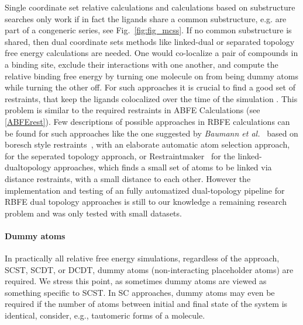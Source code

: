 \documentclass[9pt,bestpractices]{livecoms}
\begin{document}
Single coordinate set relative calculations and calculations based on substructure searches only work if in fact the ligands share a common substructure, e.g. are part of a congeneric series, see Fig.~\ref{fig:fig_mcss}.
If no common substructure is shared, then dual coordinate sets methods like linked-dual or separated topology free energy calculations are needed. One would co-localize a pair of compounds in a binding site, exclude their interactions with one another, and compute the relative binding free energy by turning one molecule on from being dummy atoms while turning the other off.
For such approaches it is crucial to find a good set of restraints, that keep the ligands colocalized over the time of the simulation . This problem is similar to the required restraints in ABFE Calculations (see \ref{ABFErest}). Few descriptions of possible approaches in RBFE calculations can be found for such approaches like the one suggested by \textit{Baumann et al.}~\cite{baumann2023broadening} based on boresch style restraints~\cite{boresch2003absolute}, with an elaborate automatic atom selection approach, for the seperated topology approach, or Restraintmaker~\cite{ries2022restraintmaker} for the linked-dualtopology approaches, which finds a small set of atoms to be linked via distance restraints, with a small distance to each other. 
However the implementation and testing of an fully automatized dual-topology pipeline for RBFE dual topology approaches is still to our knowledge a remaining research problem and was only tested with small datasets. \cite{jespers2019qligfep, Rieder2022Lev}

\paragraph{Dummy atoms}

In practically all relative free energy simulations, regardless of the approach, SCST, SCDT, or DCDT, dummy atoms (non-interacting placeholder atoms) are required. We stress this point, as sometimes dummy atoms are viewed as something specific to SCST. In SC approaches, dummy atoms may even be required if the number of atoms between initial and final state of the system is identical, consider, e.g., tautomeric forms of a molecule.
\end{document}
